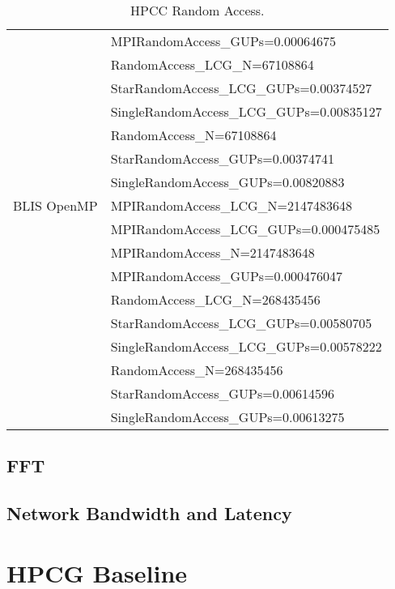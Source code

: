 \begin{table}[H]
\begin{center}
\begin{tabular}{ |l|l| }
                & MPIRandomAccess\_GUPs=0.00064675 \\
                \cline{2-2} 
                & RandomAccess\_LCG\_N=67108864 \\
                & StarRandomAccess\_LCG\_GUPs=0.00374527 \\
                & SingleRandomAccess\_LCG\_GUPs=0.00835127 \\
                \cline{2-2} 
                & RandomAccess\_N=67108864 \\
                & StarRandomAccess\_GUPs=0.00374741 \\
                & SingleRandomAccess\_GUPs=0.00820883 \\
\hline
BLIS OpenMP     & MPIRandomAccess\_LCG\_N=2147483648 \\
                & MPIRandomAccess\_LCG\_GUPs=0.000475485 \\
                \cline{2-2} 
                & MPIRandomAccess\_N=2147483648 \\
                & MPIRandomAccess\_GUPs=0.000476047 \\
                \cline{2-2} 
                & RandomAccess\_LCG\_N=268435456 \\
                & StarRandomAccess\_LCG\_GUPs=0.00580705 \\
                & SingleRandomAccess\_LCG\_GUPs=0.00578222 \\
                \cline{2-2} 
                & RandomAccess\_N=268435456 \\
                & StarRandomAccess\_GUPs=0.00614596 \\
                & SingleRandomAccess\_GUPs=0.00613275 \\
\hline
\end{tabular}
\end{center}
\caption{\label{tab:table-name}HPCC Random Access.}
\end{table}


%
%
\subsection{FFT}


%
%
\subsection{Network Bandwidth and Latency}



%
%
\section{HPCG Baseline}


